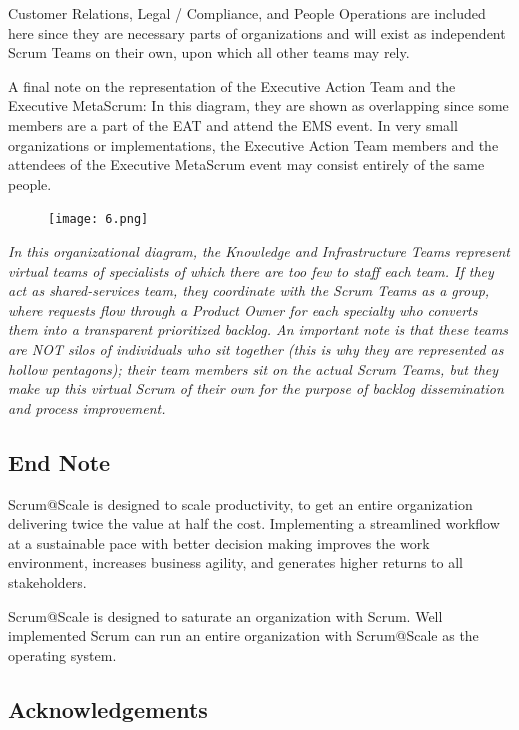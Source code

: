 \documentclass[12pt,a4paper,parskip=full]{scrartcl}
\begin{document}
Customer Relations, Legal / Compliance, and People Operations are included here since they are necessary parts of organizations and will exist as independent Scrum Teams on their own, upon which all other teams may rely.

A final note on the representation of the Executive Action Team and the Executive MetaScrum: In this diagram, they are shown as overlapping since some members are a part of the EAT and attend the EMS event. In very small organizations or implementations, the Executive
Action Team members and the attendees of the Executive MetaScrum event may consist entirely of the same people.

\begin{figure}[H]
    \centering
    \texttt{[image: 6.png]}
\end{figure}


\emph{In this organizational diagram, the Knowledge and Infrastructure Teams represent virtual teams of specialists of which there are too few to staff each team. If they act as shared-services team, they coordinate with the Scrum Teams as a group, where requests flow through a Product Owner for each specialty who converts them into a transparent prioritized backlog. An important note is that these teams are NOT silos of individuals who sit together (this is why they are represented as hollow pentagons); their team members sit on the actual Scrum Teams, but they make up this virtual Scrum of their own for the purpose of backlog dissemination and process improvement.}



\subsection{End Note}\label{End-Note}

Scrum@Scale is designed to scale productivity, to get an entire
organization delivering twice the value at half the cost. Implementing a
streamlined workflow at a sustainable pace with better decision making
improves the work environment, increases business agility, and generates
higher returns to all stakeholders.

Scrum@Scale is designed to saturate an organization with Scrum. Well
implemented Scrum can run an entire organization with Scrum@Scale as the
operating system.

\subsection{Acknowledgements}\label{Acknowledgements}
\end{document}
